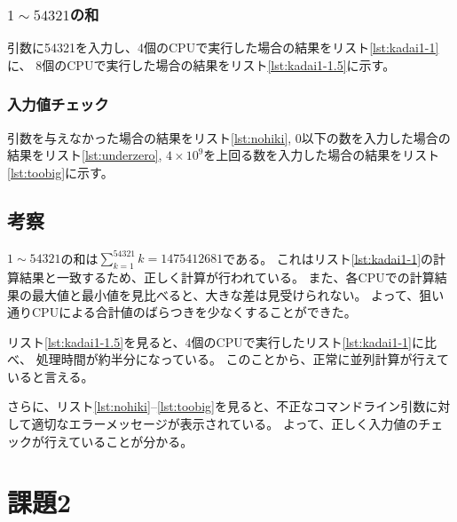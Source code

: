 \documentclass[a4j,titlepage]{jsarticle}
\begin{document}
\subsubsection{$1 \sim 54321$の和}
引数に54321を入力し、4個のCPUで実行した場合の結果をリスト\ref{lst:kadai1-1}に、
8個のCPUで実行した場合の結果をリスト\ref{lst:kadai1-1.5}に示す。





\subsubsection{入力値チェック}
引数を与えなかった場合の結果をリスト\ref{lst:nohiki}, 0以下の数を入力した場合の結果をリスト\ref{lst:underzero}, 
$4 \times 10^9$を上回る数を入力した場合の結果をリスト\ref{lst:toobig}に示す。







\subsection{考察}
$1 \sim 54321$の和は$\sum^{54321}_{k = 1} k = 1475412681$である。
これはリスト\ref{lst:kadai1-1}の計算結果と一致するため、正しく計算が行われている。
また、各CPUでの計算結果の最大値と最小値を見比べると、大きな差は見受けられない。
よって、狙い通りCPUによる合計値のばらつきを少なくすることができた。

リスト\ref{lst:kadai1-1.5}を見ると、4個のCPUで実行したリスト\ref{lst:kadai1-1}に比べ、
処理時間が約半分になっている。
このことから、正常に並列計算が行えていると言える。

さらに、リスト\ref{lst:nohiki}--\ref{lst:toobig}を見ると、不正なコマンドライン引数に対して適切なエラーメッセージが表示されている。
よって、正しく入力値のチェックが行えていることが分かる。


\section{課題2}
\end{document}
